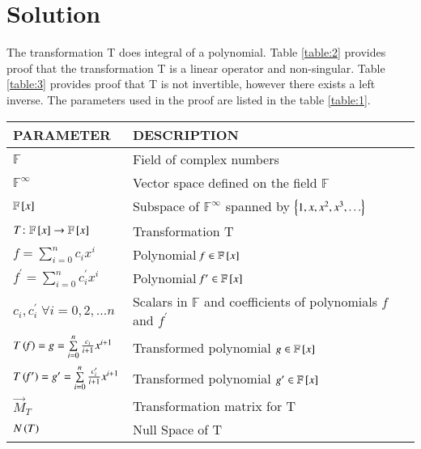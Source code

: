 \documentclass[journal,12pt,twocolumn]{IEEEtran}
\numberwithin{table}{section}
\begin{document}
\section{Solution}
The transformation T does integral of a polynomial. Table \ref{table:2} provides proof that the transformation T is a linear operator and non-singular. Table \ref{table:3} provides proof that T is not invertible, however there exists a left inverse. The parameters used in the proof are listed in the table \ref{table:1}.
\renewcommand{\thetable}{1}
\begin{table*}[ht!]
\begin{center}
\begin{tabular}{|l|l|}
\hline
\textbf{PARAMETER} & \textbf{DESCRIPTION}\\[0.5ex]
\hline
$\mathbb{F}$ & Field of complex numbers\\[0.5ex]
\hline
$\mathbb{F}^{\infty}$ & Vector space defined on the field $\mathbb{F}$\\[0.5ex]
\hline
$\mathbb{F}{}\left[x\right]$ & Subspace of $\mathbb{F}^{\infty}$ spanned by $\left\{1,x,x^2,x^3,\hdots\right\}$\\[0.5ex] 
\hline
$T\colon \mathbb{F}{}\left[x\right] \rightarrow \mathbb{F}{}\left[x\right]$ & Transformation T\\[0.5ex] 
\hline
$\mathit{f}=\sum \limits_{i=0}^n c_i x^i$ & Polynomial $\mathit{f} \in \mathbb{F}{}\left[x\right]$\\[0.5ex] 
\hline
$\mathit{f^\prime}=\sum \limits_{i=0}^n c^\prime_i x^i$ & Polynomial $\mathit{f^\prime} \in \mathbb{F}{}\left[x\right]$\\[0.5ex] 
\hline
$c_i,c^\prime_i \; \forall i=0,2,\hdots n$ & Scalars in $\mathbb{F}$ and coefficients of polynomials $\mathit{f}$ and $\mathit{f^\prime}$\\[0.5ex] 
\hline
$T\left(\mathit{f}\right)=\mathit{g}=\sum \limits_{i=0}^n \frac{c_i}{i+1} x^{i+1}$ & Transformed polynomial $\mathit{g}\in \mathbb{F}{}\left[x\right]$
\\[0.5ex] 
\hline
$T\left(\mathit{f^\prime}\right)=\mathit{g^\prime}=\sum \limits_{i=0}^n \frac{c_i^\prime}{i+1} x^{i+1}$ & Transformed polynomial $\mathit{g^\prime}\in \mathbb{F}{}\left[x\right]$
\\[0.5ex] 
\hline
$\vec{M}_T$ & Transformation matrix for T\\[0.5ex] 
\hline
$N\left(T\right)$ & Null Space of T\\[0.5ex] 
\hline
\end{tabular}
\caption{Parameters}
\label{table:1}
\end{center}
\vspace{-0.5cm}
\end{table*}
\end{document}
